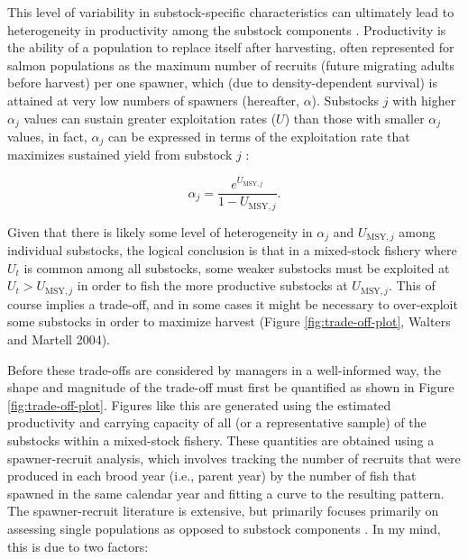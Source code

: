 \documentclass[12pt,]{book}
\theoremstyle{definition}
\theoremstyle{definition}
\theoremstyle{definition}
\theoremstyle{remark}
\begin{document}
This level of variability in substock-specific characteristics can
ultimately lead to heterogeneity in productivity among the substock
components \citep{walters-martell-2004}. Productivity is the ability of
a population to replace itself after harvesting, often represented for
salmon populations as the maximum number of recruits (future migrating
adults before harvest) per one spawner, which (due to density-dependent
survival) is attained at very low numbers of spawners (hereafter,
\(\alpha\)). Substocks \(j\) with higher \(\alpha_j\) values can sustain
greater exploitation rates (\(U\)) than those with smaller \(\alpha_j\)
values, in fact, \(\alpha_j\) can be expressed in terms of the
exploitation rate that maximizes sustained yield from substock \(j\)
\citep{schnute-kronlund-2002}:

\begin{equation}
  \alpha_j=\frac{e^{U_{\text{MSY},j}}}{1 - U_{\text{MSY},j}}.
  \label{eq:umsy-to-alpha}
\end{equation}

Given that there is likely some level of heterogeneity in \(\alpha_j\)
and \(U_{\text{MSY},j}\) among individual substocks, the logical
conclusion is that in a mixed-stock fishery where \(U_t\) is common
among all substocks, some weaker substocks must be exploited at
\(U_t > U_{\text{MSY},j}\) in order to fish the more productive
substocks at \(U_{\text{MSY},j}\). This of course implies a trade-off,
and in some cases it might be necessary to over-exploit some substocks
in order to maximize harvest (Figure \ref{fig:trade-off-plot}, Walters
and Martell 2004).

Before these trade-offs are considered by managers in a well-informed
way, the shape and magnitude of the trade-off must first be quantified
as shown in Figure \ref{fig:trade-off-plot}. Figures like this are
generated using the estimated productivity and carrying capacity of all
(or a representative sample) of the substocks within a mixed-stock
fishery. These quantities are obtained using a spawner-recruit analysis,
which involves tracking the number of recruits that were produced in
each brood year (i.e., parent year) by the number of fish that spawned
in the same calendar year and fitting a curve to the resulting pattern.
The spawner-recruit literature is extensive, but primarily focuses
primarily on assessing single populations as opposed to substock
components \citep[but see the work on Skeena River sockeye
substocks][]{walters-etal-2008, korman-english-2013}. In my mind, this
is due to two factors:
\end{document}
